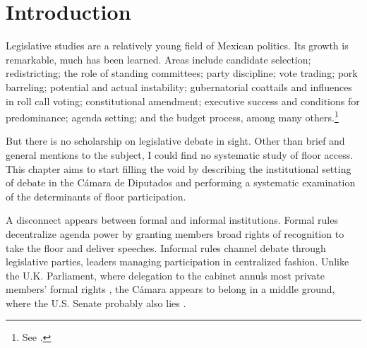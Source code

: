 \documentclass[letter,12pt]{article}
\begin{document}
\doublespacing

\section{Introduction} %

Legislative studies are a relatively young field of Mexican politics. Its growth is remarkable, much has been learned. Areas include candidate selection; redistricting; the role of standing committees; party discipline; vote trading; pork barreling; potential and actual instability; gubernatorial coattails and influences in roll call voting; constitutional amendment; executive success and conditions for predominance; agenda setting; and the budget process, among many others.\footnote{See \citet{ascencio.kerevel.cand-sel-beh.2021,magar.altman.mcd.trelles2016pg,bejar.Comisiones2009ed.book,tellez-del-rio.2018,lopez.lara.aldf2013,kerevelPork2015,heller.weldon.2003,magar.gubCoatMx.2012,rosas.langston.2011,casar.marvan2014book,bejarQuienLegisla2012,weldon.1997,casar.agsetting.2016,weldon.2002}.}


But there is no scholarship on legislative debate in sight. Other than brief and general mentions to the subject, I could find no systematic study of floor access. This chapter aims to start filling the void by describing the institutional setting of debate in the Cámara de Diputados and performing a systematic examination of the determinants of floor participation.

A disconnect appears between formal and informal institutions. Formal rules decentralize agenda power by granting members broad rights of recognition to take the floor and deliver speeches. Informal rules channel debate through legislative parties, leaders managing participation in centralized fashion. Unlike the U.K. Parliament, where delegation to the cabinet annuls most private members' formal rights \citep{cox.1987}, the Cámara appears to belong in a middle ground, where the U.S. Senate probably also lies \citep{denhartog.monroe.SenateBook.2011}.
\end{document}
